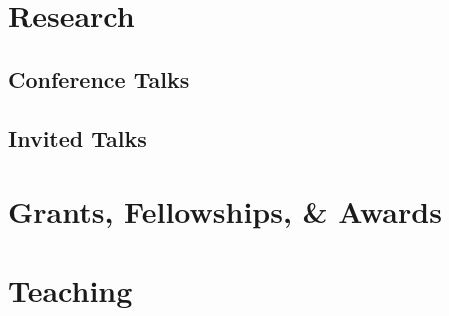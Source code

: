 \documentclass[letterpaper]{article}
\begin{document}
{\unskip}


\section*{Research}
{\unskip}


{}



\subsection*{Conference Talks}

{\unskip}


\subsection*{Invited Talks}

{\unskip}


\section*{Grants, Fellowships, \& Awards}
{\unskip}



\section*{Teaching}

{\unskip}
\end{document}
